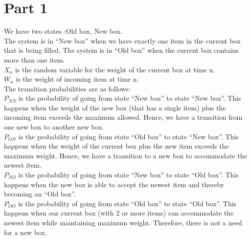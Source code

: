 \documentclass[10pt,a4paper]{article}
\begin{document}
\section{Part 1}
We have two states :{Old box, New box}. \\
The system is in ``New box'' when we have exactly one item in the current box that is being filled. The system is in ``Old box'' when the current box contains more than one item.\\
$ X_n $ is the random variable for the weight of the current box at time n.\\
$ W_n $ is the weight of incoming item at time n.\\

The transition probabilities are as follows:\\
$ P_{NN} $ is the probability of going from state ``New box'' to state ``New box''. This happens when the weight of the new box (that has a single item) plus the incoming item exceeds the maximum allowed. Hence, we have a transition from one new box to another new box.\\
$ P_{ON} $ is the probability of going from state ``Old box'' to state ``New box''. This happens when the weight of the current box plus the new item exceeds the maximum weight. Hence, we have a transition to a new box to accommodate the newest item.\\
$ P_{NO} $ is the probability of going from state ``New box'' to state ``Old box''. This happens when the new box is able to accept the newest item and thereby becoming an ``Old box''.\\
$ P_{OO} $ is the probability of going from state ``Old box'' to state ``Old box''. This happens when our current box (with 2 or more items) can accommodate the newest item while maintaining maximum weight. Therefore, there is not a need for a new box. \\
\end{document}

